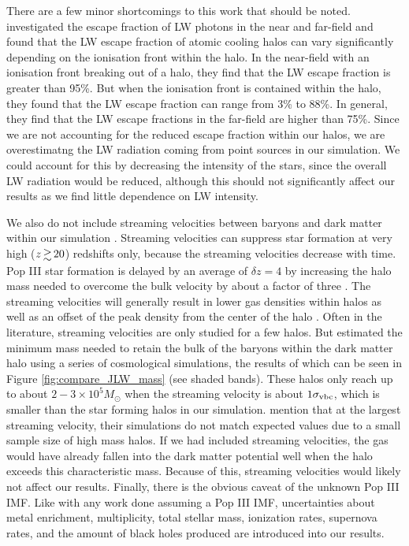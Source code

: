 \documentclass[a4paper,fleqn,usenatbib]{mnras}
\begin{document}
There are a few minor shortcomings to this work that should be noted. \citet{Schauer17} investigated the escape fraction of LW photons in the near and far-field and found that the LW escape fraction of atomic cooling halos can vary significantly depending on the ionisation front within the halo. In the near-field with an ionisation front breaking out of a halo, they find that the LW escape fraction is greater than 95\%. But when the ionisation front is contained within the halo, they found that the LW escape fraction can range from 3\% to 88\%. In general, they find that the LW escape fractions in the far-field are higher than 75\%. Since we are not accounting for the reduced escape fraction within our halos, we are overestimatng the LW radiation coming from point sources in our simulation. We could account for this by decreasing the intensity of the stars, since the overall LW radiation would be reduced, although this should not significantly affect our results as we find little dependence on LW intensity. 

We also do not include streaming velocities between baryons and dark matter within our simulation \citep{Tselia11, Greif11_Delay, Naoz12, OLeary12}. Streaming velocities can suppress star formation at very high ($z \ga 20$) redshifts only, because the streaming velocities decrease with time. Pop III star formation is delayed by an average of $\delta z = 4$ by increasing the halo mass needed to overcome the bulk velocity by about a factor of three \citep{Greif11_Delay}. The streaming velocities will generally result in lower gas densities within halos as well as an offset of the peak density from the center of the halo \citep{OLeary12}. Often in the literature, streaming velocities are only studied for a few halos. But \citet{Naoz13} estimated the minimum mass needed to retain the bulk of the baryons within the dark matter halo using a series of cosmological simulations, the results of which can be seen in Figure \ref{fig:compare_JLW_mass} (see shaded bands). These halos only reach up to about $2 - 3 \times 10^5 M_\odot$ when the streaming velocity is about $1\sigma_{\rm vbc}$, which is smaller than the star forming halos in our simulation. \citet{Naoz13} mention that at the largest streaming velocity, their simulations do not match expected values due to a small sample size of high mass halos. If we had included streaming velocities, the gas would have already fallen into the dark matter potential well when the halo exceeds this characteristic mass. Because of this, streaming velocities would likely not affect our results. Finally, there is the obvious caveat of the unknown Pop III IMF. Like with any work done assuming a Pop III IMF, uncertainties about metal enrichment, multiplicity, total stellar mass, ionization rates, supernova rates, and the amount of black holes produced are introduced into our results. 
\end{document}
